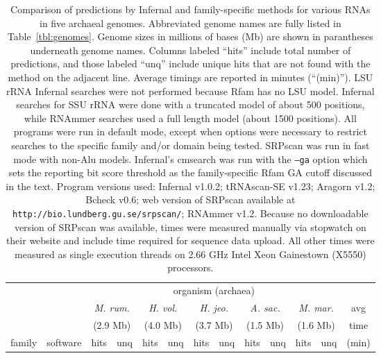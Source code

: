 %
\begin{table}
\caption{Comparison of predictions by Infernal and family-specific
  methods for various RNAs in five archaeal genomes. Abbreviated
  genome names are fully listed in Table~\ref{tbl:genomes}.  Genome
  sizes in millions of bases (Mb) are shown in parantheses underneath
  genome names. Columns labeled ``hits'' include total number of
  predictions, and those labeled ``unq'' include unique hits that are
  not found with the method on the adjacent line. Average timings are
  reported in minutes (``(min)''). LSU rRNA Infernal
  searches were not performed because Rfam has no LSU model.  Infernal
  searches for SSU rRNA were done with a truncated model of about 500
  positions, while RNAmmer searches used a full length model (about
  1500 positions). All programs were run in default mode, except when
  options were necessary to restrict searches to the specific family
  and/or domain being tested. SRPscan was run in fast mode with
  non-Alu models. Infernal's cmsearch was run with the {\tt --ga}
  option which sets the reporting bit score threshold as the
  family-specific Rfam GA cutoff discussed in the text. Program
  versions used: Infernal v1.0.2; tRNAscan-SE v1.23; Aragorn v1.2;
  Bcheck v0.6; web version of SRPscan available at {\tt
    http://bio.lundberg.gu.se/srpscan/}; RNAmmer v1.2. Because no
  downloadable version of SRPscan was available, times were measured
  manually via stopwatch on their website and include time required
  for sequence data upload. All other times were measured as single
  execution threads on 2.66 GHz Intel Xeon Gainestown (X5550)
  processors.
 }
\begin{center}
\begin{tabular}{|l|l|rr|rr|rr|rr|rr|r|}
\multicolumn{1}{c}{} & \multicolumn{1}{c}{} &  \multicolumn{10}{c}{organism (archaea)}   & \multicolumn{1}{c}{} \\ \cline{3-12}
\multicolumn{1}{c}{}  &  \multicolumn{1}{c|}{}  &  \multicolumn{2}{c|}{\emph{M. rum.}}  &  \multicolumn{2}{c|}{\emph{H. vol.}}  &  \multicolumn{2}{c|}{\emph{H. jeo.}}  &  \multicolumn{2}{c|}{\emph{A. sac.}}  &  \multicolumn{2}{c|}{\emph{M. mar.}}   & \multicolumn{1}{c}{avg} \\ 
\multicolumn{1}{c}{}  &  \multicolumn{1}{c|}{}  &  \multicolumn{2}{c|}{(2.9 Mb)}  &  \multicolumn{2}{c|}{(4.0 Mb)}  &  \multicolumn{2}{c|}{(3.7 Mb)}  &  \multicolumn{2}{c|}{(1.5 Mb)}  &  \multicolumn{2}{c|}{(1.6 Mb)} & \multicolumn{1}{c}{time}  \\ 
\multicolumn{1}{c}{family}  &  \multicolumn{1}{c|}{software}  &  hits & unq &  hits & unq &  hits & unq &  hits & unq &  hits & unq  & \multicolumn{1}{c}{(min)} \\ \hline 

\end{tabular}
\end{center}
\end{table}
